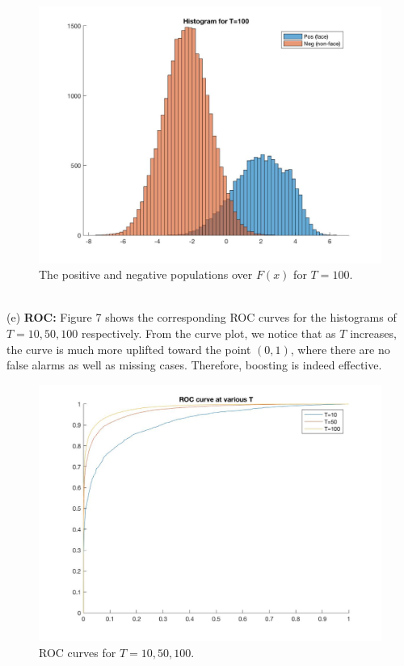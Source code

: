 \documentclass[10pt]{article}
\begin{document}
	\begin{figure}[ht]
		\includegraphics[scale = 0.2]{pos_neg_hist_100.jpg}
		\centering
		\caption{The positive and negative populations over $F(x)$ for $T=100$.}
		\label{6}
	\end{figure}\\
	\newpage(e) \textbf{ROC:} Figure 7 shows the corresponding ROC curves for the histograms of $T=10,50,100$ respectively. From the curve plot, we notice that as $T$ increases, the curve is much more uplifted toward the point $(0,1)$, where there are no false alarms as well as missing cases. Therefore, boosting is indeed effective.\\
	\begin{figure}[ht]
		\includegraphics[scale = 0.25]{roc.jpg}
		\centering
		\caption{ROC curves for $T=10,50,100$.}
		\label{7}
	\end{figure}\\
\end{document}
